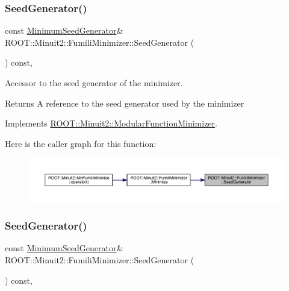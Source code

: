 \subsubsection{\texorpdfstring{SeedGenerator()}{SeedGenerator()}\hspace{0.1cm}{\footnotesize\ttfamily [1/3]}}
{\footnotesize\ttfamily const \mbox{\hyperlink{classROOT_1_1Minuit2_1_1MinimumSeedGenerator}{Minimum\+Seed\+Generator}}\& R\+O\+O\+T\+::\+Minuit2\+::\+Fumili\+Minimizer\+::\+Seed\+Generator (\begin{DoxyParamCaption}{ }\end{DoxyParamCaption}) const\hspace{0.3cm}{\ttfamily [inline]}, {\ttfamily [virtual]}}

Accessor to the seed generator of the minimizer.

\begin{DoxyReturn}{Returns}
A reference to the seed generator used by the minimizer 
\end{DoxyReturn}


Implements \mbox{\hyperlink{classROOT_1_1Minuit2_1_1ModularFunctionMinimizer_a742930de97b0ce9ba23773874ae0894b}{R\+O\+O\+T\+::\+Minuit2\+::\+Modular\+Function\+Minimizer}}.

Here is the caller graph for this function\+:
\nopagebreak
\begin{figure}[H]
\begin{center}
\leavevmode
\includegraphics[width=350pt]{db/da1/classROOT_1_1Minuit2_1_1FumiliMinimizer_ad8906dbac7f0c20284e361be606d5634_icgraph}
\end{center}
\end{figure}
\mbox{\label{classROOT_1_1Minuit2_1_1FumiliMinimizer_ad8906dbac7f0c20284e361be606d5634}} 
\subsubsection{\texorpdfstring{SeedGenerator()}{SeedGenerator()}\hspace{0.1cm}{\footnotesize\ttfamily [2/3]}}
{\footnotesize\ttfamily const \mbox{\hyperlink{classROOT_1_1Minuit2_1_1MinimumSeedGenerator}{Minimum\+Seed\+Generator}}\& R\+O\+O\+T\+::\+Minuit2\+::\+Fumili\+Minimizer\+::\+Seed\+Generator (\begin{DoxyParamCaption}{ }\end{DoxyParamCaption}) const\hspace{0.3cm}{\ttfamily [inline]}, {\ttfamily [virtual]}}

